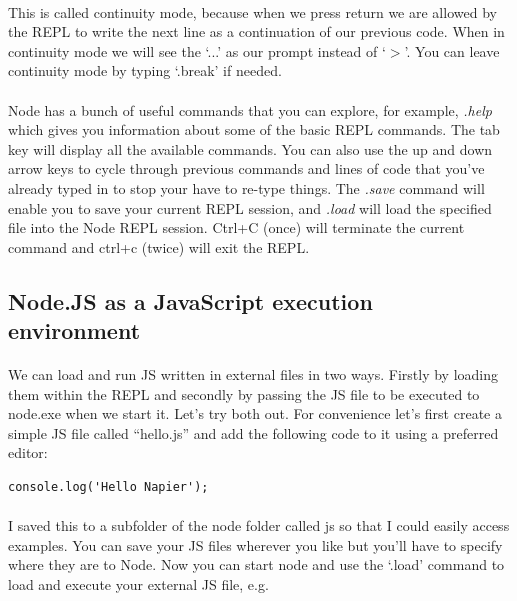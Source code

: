 \documentclass[10pt, a4paper, twosize]{article}
\begin{document}
\paragraph{} This is called continuity mode, because when we press return we are allowed by the REPL to write the next line as a continuation of our previous code. When in continuity mode we will see the `...' as our prompt instead of `$>$'. You can leave continuity mode by typing `.break' if needed.

\paragraph{} Node has a bunch of useful commands that you can explore, for example, \emph{.help} which gives you information about some of the basic REPL commands. The tab key will display all the available commands. You can also use the up and down arrow keys to cycle through previous commands and lines of code that you've already typed in to stop your have to re-type things. The \emph{.save} command will enable you to save your current REPL session, and \emph{.load} will load the specified file into the Node REPL session. Ctrl+C (once) will terminate the current command and ctrl+c (twice) will exit the REPL.


\subsection{Node.JS as a JavaScript execution environment}
\paragraph{} We can load and run JS written in external files in two ways. Firstly by loading them within the REPL and secondly by passing the JS file to be executed to node.exe when we start it. Let's try both out. For convenience let's first create a simple JS file called ``hello.js'' and add the following code to it using a preferred editor:

\begin{lstlisting}
console.log('Hello Napier');
\end{lstlisting}

\paragraph{} I saved this to a subfolder of the node folder called js so that I could easily access examples. You can save your JS files wherever you like but you'll have to specify where they are to Node. Now you can start node and use the `.load' command to load and execute your external JS file, e.g.\\
\end{document}
